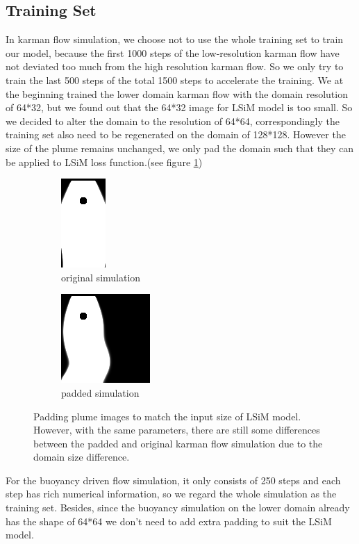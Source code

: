\documentclass[a4paper,12pt,twoside]{report}
\begin{document}
\subsection{Training Set}
In karman flow simulation, we choose not to use the whole training set to train our model, because the first 1000 steps of the low-resolution karman flow have not deviated too much from the high resolution karman flow. So we only try to train the last 500 steps of the total 1500 steps to accelerate the training. We at the beginning trained the lower domain karman flow with the domain resolution of 64*32, but we found out that the 64*32 image for LSiM model is too small. So we decided to alter the domain to the resolution of 64*64, correspondingly the training set also need to be regenerated on the domain of 128*128. However the size of the plume remains unchanged, we only pad the domain such that they can be applied to LSiM loss function.(see figure \ref{pad})
\begin{figure}
\centering
\begin{subfigure}{0.4\textwidth}
  \centering
  \includegraphics[scale=1]{nonpad_karmanflow.png}
  \caption{original simulation}
\end{subfigure}
\begin{subfigure}{0.4\textwidth}
  \centering
  \includegraphics[scale=1]{pad_karmanflow.png}
  \caption{padded simulation}
\end{subfigure}
\caption{Padding plume images to match the input size of LSiM model. However, with the same parameters, there are still some differences between the padded and original karman flow simulation due to the domain size difference.}
\label{pad}
\end{figure}
For the buoyancy driven flow simulation, it only consists of 250 steps and each step has rich numerical information, so we regard the whole simulation as the training set. Besides, since the buoyancy simulation on the lower domain already has the shape of 64*64 we don't need to add extra padding to suit the LSiM model.
\end{document}
